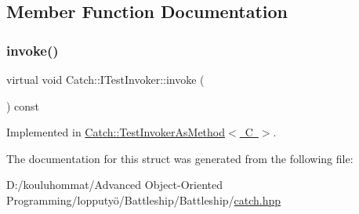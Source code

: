 \subsection{Member Function Documentation}
\mbox{\label{struct_catch_1_1_i_test_invoker_a6fcd5c5b67d6d5ade6491ff33411ca7f}} 
\subsubsection{\texorpdfstring{invoke()}{invoke()}}
{\footnotesize\ttfamily virtual void Catch\+::\+I\+Test\+Invoker\+::invoke (\begin{DoxyParamCaption}{ }\end{DoxyParamCaption}) const\hspace{0.3cm}{\ttfamily [pure virtual]}}



Implemented in \mbox{\hyperlink{class_catch_1_1_test_invoker_as_method_a8115a06efe273f4112ec0b5452c1b5f2}{Catch\+::\+Test\+Invoker\+As\+Method$<$ C $>$}}.



The documentation for this struct was generated from the following file\+:\begin{DoxyCompactItemize}
\item 
D\+:/kouluhommat/\+Advanced Object-\/\+Oriented Programming/lopputyö/\+Battleship/\+Battleship/\mbox{\hyperlink{catch_8hpp}{catch.\+hpp}}\end{DoxyCompactItemize}
